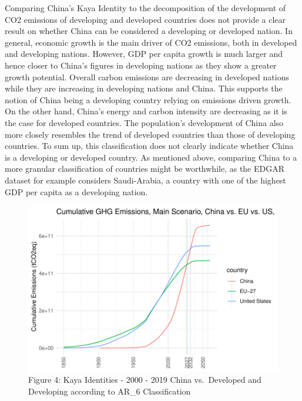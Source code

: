\documentclass[
  12pt,
]{article}
\numberwithin{equation}{section}
\numberwithin{table}{section}
\numberwithin{figure}{section}
\begin{document}
Comparing China's Kaya Identity to the decomposition of the development
of CO2 emissions of developing and developed countries does not provide
a clear result on whether China can be considered a developing or
developed nation. In general, economic growth is the main driver of CO2
emissions, both in developed and developing nations. However, GDP per
capita growth is much larger and hence closer to China's figures in
developing nations as they show a greater growth potential. Overall
carbon emissions are decreasing in developed nations while they are
increasing in developing nations and China. This supports the notion of
China being a developing country relying on emissions driven growth. On
the other hand, China's energy and carbon intensity are decreasing as it
is the case for developed countries. The population's development of
China also more closely resembles the trend of developed countries than
those of developing countries. To sum up, this classification does not
clearly indicate whether China is a developing or developed country. As
mentioned above, comparing China to a more granular classification of
countries might be worthwhile, as the EDGAR dataset for example
considers Saudi-Arabia, a country with one of the highest GDP per capita
as a developing nation.

\begin{figure}
\centering
\includegraphics{Paper_files/figure-latex/unnamed-chunk-4-1.pdf}
\caption{Figure 4: Kaya Identities - 2000 - 2019\textbar{} China
vs.~Developed and Developing according to AR\_6 Classification}
\end{figure}
\end{document}

